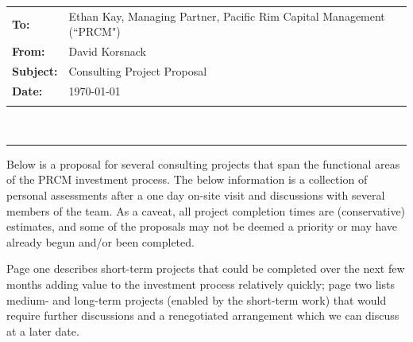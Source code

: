 \documentclass[6pt]{article}
\begin{document}
\begin{tabular}{ll}
  \textbf{To:} & Ethan Kay, Managing Partner, Pacific Rim Capital Management (``PRCM") \\
  \textbf{From:} & David Korsnack \\
  \textbf{Subject:} & Consulting Project Proposal \\
  \textbf{Date:} & \today \\
  \vspace{0.01in}
\end{tabular} \\

\noindent\rule{7.5in}{0.4pt}

Below is a proposal for several consulting projects that span the functional
areas of the PRCM investment process. The below information is a collection of
personal assessments after a one day on-site visit and discussions with several
members of the team. As a caveat, all project completion times are (conservative)
estimates, and some of the proposals may not be deemed a priority or may have
already begun and/or been completed. \\
\vspace{0.1in}

Page one describes short-term projects that could be completed over the
next few months adding value to the investment process relatively quickly; page
two lists medium- and long-term projects (enabled by the short-term work) that
would require further discussions and a renegotiated arrangement which we can
discuss at a later date. \\
\vspace{0.2in}
\end{document}
